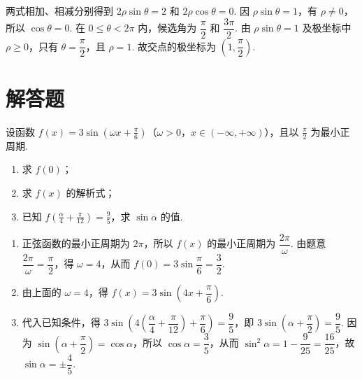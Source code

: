 \begin{solution}
两式相加、相减分别得到 \(2\rho\sin\theta=2\) 和 \(2\rho\cos\theta=0\). 因 \(\rho\sin\theta=1\)，有 \(\rho\ne0\)，所以 \(\cos\theta=0\). 在 \(0\leqslant\theta<2\pi\) 内，候选角为 \(\dfrac\pi2\) 和 \(\dfrac{3\pi}{2}\). 由 \(\rho\sin\theta=1\) 及极坐标中 \(\rho\ge0\)，只有 \(\theta=\dfrac\pi2\)，且 \(\rho=1\). 故交点的极坐标为 \(\left(1,\dfrac\pi2\right)\).
\end{solution}

\section{解答题}

\begin{problem}
设函数 \(f(x) = 3\sin \left(\omega x + \frac{\pi}{6}\right)\)（\(\omega > 0\)，\(x \in (-\infty, +\infty)\)），且以 \(\frac{\pi}{2}\) 为最小正周期.

\begin{enumerate}
\item 求 \(f(0)\)；
\item 求 \(f(x)\) 的解析式；
\item 已知 \(f\left(\frac{\alpha}{4} + \frac{\pi}{12}\right) = \frac{9}{5}\)，求 \(\sin \alpha\) 的值.
\end{enumerate}
\end{problem}

\begin{solution}
\begin{enumerate}
\item 正弦函数的最小正周期为 \(2\pi\)，所以 \(f(x)\) 的最小正周期为 \(\dfrac{2\pi}{\omega}\). 由题意 \(\dfrac{2\pi}{\omega}=\dfrac\pi2\)，得 \(\omega=4\)，从而 \(f(0)=3\sin\dfrac\pi6=\dfrac32\).
\item 由上面的 \(\omega=4\)，得 \(f(x)=3\sin\left(4x+\dfrac\pi6\right)\).
\item 代入已知条件，得
\(3\sin\left(4\left(\dfrac\alpha4+\dfrac\pi{12}\right)+\dfrac\pi6\right)=\dfrac95\)，即 \(3\sin\left(\alpha+\dfrac\pi2\right)=\dfrac95\). 因为 \(\sin(\alpha+\dfrac\pi2)=\cos\alpha\)，所以 \(\cos\alpha=\dfrac35\)，从而 \(\sin^2\alpha=1-\dfrac9{25}=\dfrac{16}{25}\)，故 \(\sin\alpha=\pm\dfrac45\).
\end{enumerate}
\end{solution}

